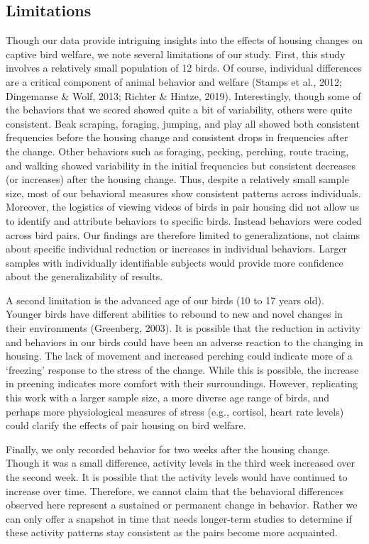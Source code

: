 \documentclass[
  pub]{apa6}
\begin{document}
\hypertarget{limitations}{%
\subsection{Limitations}\label{limitations}}

Though our data provide intriguing insights into the effects of housing changes on captive bird welfare, we note several limitations of our study. First, this study involves a relatively small population of 12 birds. Of course, individual differences are a critical component of animal behavior and welfare (Stamps et al., 2012; Dingemanse \& Wolf, 2013; Richter \& Hintze, 2019). Interestingly, though some of the behaviors that we scored showed quite a bit of variability, others were quite consistent. Beak scraping, foraging, jumping, and play all showed both consistent frequencies before the housing change and consistent drops in frequencies after the change. Other behaviors such as foraging, pecking, perching, route tracing, and walking showed variability in the initial frequencies but consistent decreases (or increases) after the housing change. Thus, despite a relatively small sample size, most of our behavioral measures show consistent patterns across individuals. Moreover, the logistics of viewing videos of birds in pair housing did not allow us to identify and attribute behaviors to specific birds. Instead behaviors were coded across bird pairs. Our findings are therefore limited to generalizations, not claims about specific individual reduction or increases in individual behaviors. Larger samples with individually identifiable subjects would provide more confidence about the generalizability of results.

A second limitation is the advanced age of our birds (10 to 17 years old). Younger birds have different abilities to rebound to new and novel changes in their environments (Greenberg, 2003). It is possible that the reduction in activity and behaviors in our birds could have been an adverse reaction to the changing in housing. The lack of movement and increased perching could indicate more of a `freezing' response to the stress of the change. While this is possible, the increase in preening indicates more comfort with their surroundings. However, replicating this work with a larger sample size, a more diverse age range of birds, and perhaps more physiological measures of stress (e.g., cortisol, heart rate levels) could clarify the effects of pair housing on bird welfare.

Finally, we only recorded behavior for two weeks after the housing change. Though it was a small difference, activity levels in the third week increased over the second week. It is possible that the activity levels would have continued to increase over time. Therefore, we cannot claim that the behavioral differences observed here represent a sustained or permanent change in behavior. Rather we can only offer a snapshot in time that needs longer-term studies to determine if these activity patterns stay consistent as the pairs become more acquainted.
\end{document}
